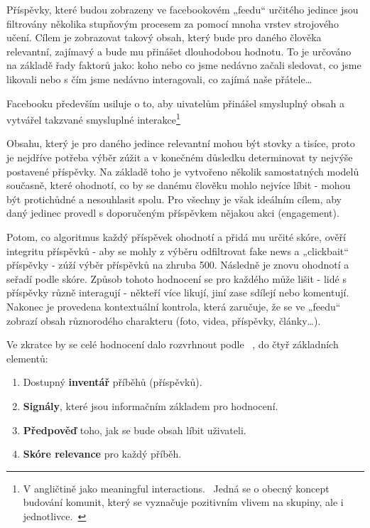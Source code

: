     Příspěvky, které budou zobrazeny ve facebookovém „feedu“ určitého jedince jsou filtrovány několika stupňovým procesem za pomocí mnoha vrstev strojového učení. Cílem je zobrazovat takový obsah, který bude pro daného člověka relevantní, zajímavý a bude mu přinášet dlouhodobou hodnotu. To je určováno na základě řady faktorů jako: koho nebo co jsme nedávno začali sledovat, co jsme likovali nebo s čím jsme nedávno interagovali, co zajímá naše přátele\dots
    
    Facebooku především usiluje o to, aby uivatelům přinášel smysluplný obsah a vytvářel takzvané smysluplné interakce\footnote{V angličtině jako meaningful interactions.~\citep{facebook_2018} Jedná se o obecný koncept budování komunit, který se vyznačuje pozitivním vlivem na skupiny, ale i jednotlivce.~\citep{department2009guidance} }
    
    Obsahu, který je pro daného jedince relevantní mohou být stovky a tisíce, proto je nejdříve potřeba výběr zúžit a v konečném důsledku determinovat ty nejvýše postavené příspěvky. Na základě toho je vytvořeno několik samostatných modelů současně, které ohodnotí, co by se danému člověku mohlo nejvíce líbit - mohou být protichůdné a nesouhlasit spolu. Pro všechny je však ideálním cílem, aby daný jedinec provedl s doporučeným příspěvkem nějakou akci (engagement).
    
    Potom, co algoritmus každý příspěvek ohodnotí a přidá mu určité skóre, ověří integritu příspěvků - aby se mohly z výběru odfiltrovat fake news a „clickbait“ příspěvky - zúží výběr příspěvků na zhruba 500. Následně je znovu ohodnotí a seřadí podle skóre. Způsob tohoto hodnocení se pro každého může lišit - lidé s příspěvky různě interagují - někteří více likují, jiní zase sdílejí nebo komentují. Nakonec je provedena kontextuální kontrola, která zaručuje, že se ve „feedu“ zobrazí obsah různorodého charakteru (foto, videa, příspěvky, články\dots).~\citep{lada_wang_yan_2021}
    
    Ve zkratce by se celé hodnocení dalo rozvrhnout podle ~\citep{mosseri_2019}, do čtyř základních elementů: 
    \begin{enumerate}
      \item Dostupný \textbf{inventář} příběhů (příspěvků). 
      \item \textbf{Signály}, které jsou informačním základem pro hodnocení.
      \item \textbf{Předpověď} toho, jak se bude obsah líbit uživateli.
      \item \textbf{Skóre relevance} pro každý příběh.
    \end{enumerate} 
    
